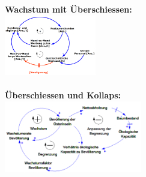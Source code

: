 \begin{multicols}{2}
	\textbf{Wachstum mit Überschiessen:} \\
	\includegraphics[width=0.3\textwidth]{pictures/struktur_5} \\ \\
	\textbf{Überschiessen und Kollaps:} \\
	\includegraphics[width=0.45\textwidth]{pictures/struktur_6} 
\end{multicols}	

